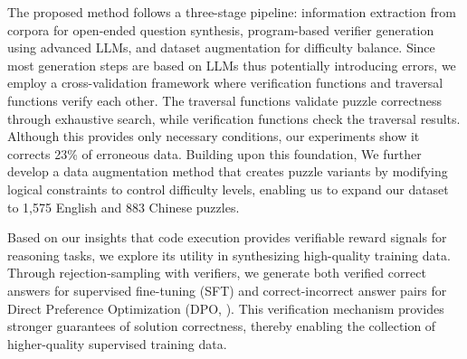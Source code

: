 The proposed method follows a three-stage pipeline: information extraction from corpora for open-ended question synthesis, program-based verifier generation using advanced LLMs, and dataset augmentation for difficulty balance. Since most generation steps are based on LLMs thus potentially introducing errors, we employ a cross-validation framework where verification functions and traversal functions verify each other. The traversal functions validate puzzle correctness through exhaustive search, while verification functions check the traversal results. Although this provides only necessary conditions, our experiments show it corrects 23\% of erroneous data. Building upon this foundation, We further develop a data augmentation method that creates puzzle variants by modifying logical constraints to control difficulty levels, enabling us to expand our dataset to 1,575 English and 883 Chinese puzzles.

Based on our insights that code execution provides verifiable reward signals for reasoning tasks, we explore its utility in synthesizing high-quality training data. Through rejection-sampling with verifiers, we generate both verified correct answers for supervised fine-tuning (SFT) and correct-incorrect answer pairs for Direct Preference Optimization (DPO, \citealp{rafailov2024directpreferenceoptimizationlanguage}). This verification mechanism provides stronger guarantees of solution correctness, thereby enabling the collection of higher-quality supervised training data.


